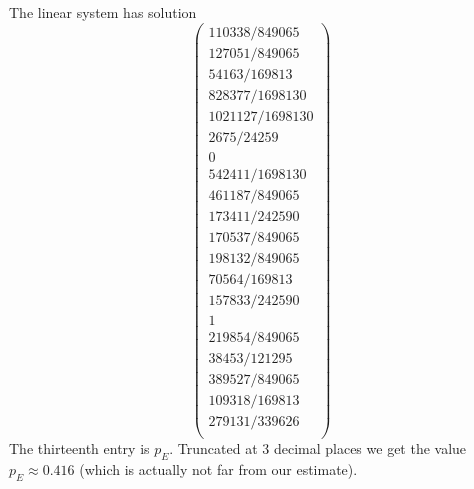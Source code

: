 \documentclass[12 pt, letterpaper]{hmcpset}
\begin{document}
\begin{landscape}
\begin{solution}
\begin{enumerate}
			The linear system has solution
			\[
				\begin{pmatrix}
					110338/849065 \\
					127051/849065 \\
					54163/169813 \\
					828377/1698130 \\
					1021127/1698130 \\
					2675/24259 \\
					0 \\
					542411/1698130 \\
					461187/849065 \\
					173411/242590 \\
					170537/849065 \\
					198132/849065 \\
					70564/169813 \\
					157833/242590 \\
					1 \\
					219854/849065 \\
					38453/121295 \\
					389527/849065 \\
					109318/169813 \\
					279131/339626 \\
				\end{pmatrix}
			\]
			The thirteenth entry is $p_{E}$. Truncated at 3 decimal places we get the value  $p_{E} \approx 0.416$ (which is actually not far from our estimate).
	\end{enumerate}
\end{solution}

\end{landscape}

\pagebreak
\end{document}
